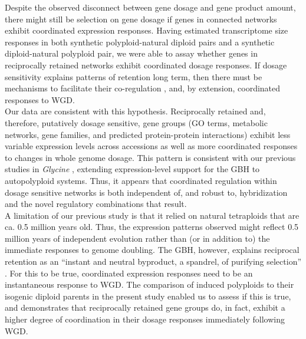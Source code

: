 \documentclass[11pt]{article}
\begin{document}
Despite the observed disconnect between gene dosage and gene product amount, there might still be selection on gene dosage if genes in connected networks exhibit coordinated expression responses.
Having estimated transcriptome size responses in both synthetic polyploid-natural diploid pairs and a synthetic diploid-natural polyploid pair, we were able to assay whether genes in reciprocally retained networks exhibit coordinated dosage responses.
If dosage sensitivity explains patterns of retention long term, then there must be mechanisms to facilitate their co-regulation \citep{papp2003}, and, by extension, coordinated responses to WGD.\\

Our data are consistent with this hypothesis.
Reciprocally retained and, therefore, putatively dosage sensitive, gene groups (GO terms, metabolic networks, gene families, and predicted protein-protein interactions) exhibit less variable expression levels across accessions as well as more coordinated responses to changes in whole genome dosage.
This pattern is consistent with our previous studies in \textit{Glycine} \citep{coate2016}, extending expression-level support for the GBH to autopolyploid systems. Thus, it appears that coordinated regulation within dosage sensitive networks is both independent of, and robust to, hybridization and the novel regulatory combinations that result.\\

A limitation of our previous study \citep{coate2016} is that it relied on natural tetraploids that are ca. 0.5 million years old.
Thus, the expression patterns observed might reflect 0.5 million years \citep{bombarely2014} of independent evolution rather than (or in addition to) the immediate responses to genome doubling.
The GBH, however, explains  reciprocal retention as an ``instant and neutral byproduct, a spandrel, of purifying selection'' \citep{freeling2009}.
For this to be true, coordinated expression responses need to be an instantaneous response to WGD.
The comparison of induced polyploids to their isogenic diploid parents in the present study enabled us to assess if this is true, and demonstrates that reciprocally retained gene groups do, in fact, exhibit a higher degree of coordination in their dosage responses immediately following WGD.\\
\end{document}

